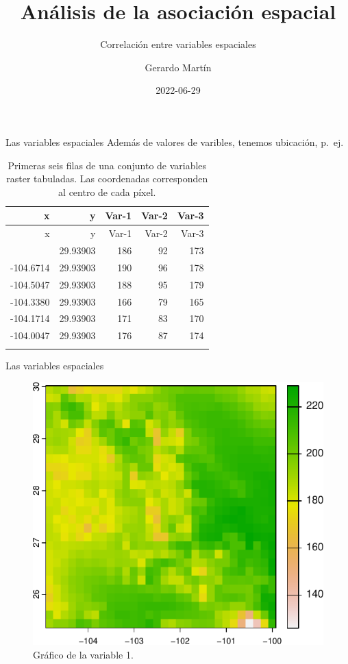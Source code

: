 \documentclass[
  11pt,
  ignorenonframetext,
]{beamer}
\title{Análisis de la asociación espacial}
\subtitle{Correlación entre variables espaciales}
\author{Gerardo Martín}
\date{2022-06-29}
\begin{document}
\frame{\titlepage}

\begin{frame}{Las variables espaciales}
\protect\hypertarget{las-variables-espaciales}{}
Además de valores de varibles, tenemos ubicación, p.~ej.

\begin{longtable}[]{@{}rrrrr@{}}
\caption{Primeras seis filas de una conjunto de variables raster
tabuladas. Las coordenadas corresponden al centro de cada
píxel.}\tabularnewline
\toprule\noalign{}
x & y & Var-1 & Var-2 & Var-3 \\
\midrule\noalign{}
\endfirsthead
\toprule\noalign{}
x & y & Var-1 & Var-2 & Var-3 \\
\midrule\noalign{}
\endhead
-104.8380 & 29.93903 & 186 & 92 & 173 \\
-104.6714 & 29.93903 & 190 & 96 & 178 \\
-104.5047 & 29.93903 & 188 & 95 & 179 \\
-104.3380 & 29.93903 & 166 & 79 & 165 \\
-104.1714 & 29.93903 & 171 & 83 & 170 \\
-104.0047 & 29.93903 & 176 & 87 & 174 \\
\bottomrule\noalign{}
\end{longtable}
\end{frame}

\begin{frame}{Las variables espaciales}
\protect\hypertarget{las-variables-espaciales-1}{}
\begin{figure}

{\centering \includegraphics{Correlacion-espacial_files/figure-beamer/unnamed-chunk-2-1} 

}

\caption{Gráfico de la variable 1.}\label{fig:unnamed-chunk-2}
\end{figure}
\end{frame}
\end{document}
